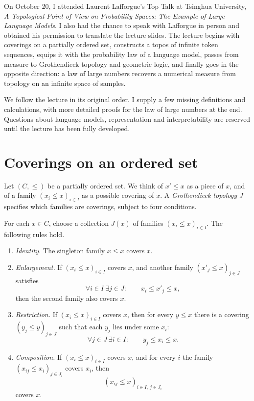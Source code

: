
On October 20, I attended Laurent Lafforgue's Top Talk at Tsinghua University, \emph{A Topological Point of View on Probability Spaces: The Example of Large Language Models}. I also had the chance to speak with Lafforgue in person and obtained his permission to translate the lecture slides. The lecture begins with coverings on a partially ordered set, constructs a topos of infinite token sequences, equips it with the probability law of a language model, passes from measure to Grothendieck topology and geometric logic, and finally goes in the opposite direction: a law of large numbers recovers a numerical measure from topology on an infinite space of samples.

We follow the lecture in its original order. I supply a few missing definitions and calculations, with more detailed proofs for the law of large numbers at the end. Questions about language models, representation and interpretability are reserved until the lecture has been fully developed.

\section{Coverings on an ordered set}

Let \((C,\leq)\) be a partially ordered set. We think of \(x'\leq x\) as a piece of \(x\), and of a family \((x_i\leq x)_{i\in I}\) as a possible covering of \(x\). A \emph{Grothendieck topology} \(J\) specifies which families are coverings, subject to four conditions.

\begin{definition}
For each \(x\in C\), choose a collection \(J(x)\) of families \((x_i\leq x)_{i\in I}\). The following rules hold.
\begin{enumerate}
 \item \emph{Identity.} The singleton family \(x\leq x\) covers \(x\).
 \item \emph{Enlargement.} If \((x_i\leq x)_{i\in I}\) covers \(x\), and another family \((x'_j\leq x)_{j\in J}\) satisfies
 \[
 \forall i\in I\ \exists j\in J:\qquad x_i\leq x'_j\leq x,
 \]
 then the second family also covers \(x\).
 \item \emph{Restriction.} If \((x_i\leq x)_{i\in I}\) covers \(x\), then for every \(y\leq x\) there is a covering \((y_j\leq y)_{j\in J}\) such that each \(y_j\) lies under some \(x_i\):
 \[
 \forall j\in J\ \exists i\in I:\qquad y_j\leq x_i\leq x.
 \]
 \item \emph{Composition.} If \((x_i\leq x)_{i\in I}\) covers \(x\), and for every \(i\) the family \((x_{ij}\leq x_i)_{j\in J_i}\) covers \(x_i\), then
 \[
 (x_{ij}\leq x)_{i\in I,\ j\in J_i}
 \]
 covers \(x\).
\end{enumerate}
\end{definition}

